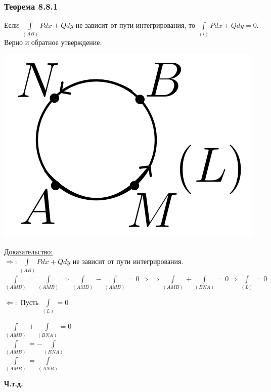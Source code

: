 \documentclass[12pt]{article}
\let\ORIincludegraphics\includegraphics
\renewcommand{\includegraphics}[2][]{\ORIincludegraphics[scale=0.65,#1]{#2}}
\let\oldint\int
\renewcommand{\int}{\oldint\limits}
\begin{document}
  \subsubsection*{Теорема 8.8.1}\label{th:8.8.1}
  \par\noindent
  Если $\int_{(AB)}Pdx+Qdy$ не зависит от пути интегрирования, то $\int_{(l)}Pdx+Qdy=0.$Верно и обратное утверждение.\\
  \begin{minipage}{0.25\textwidth}
    \includegraphics[scale=0.5]{8.8.1.png}
  \end{minipage}
  \hspace{1em}
  \begin{minipage}{0.75\textwidth}
    \underline{Доказательство:}\\
      $\Rightarrow : \int_{(AB)}Pdx+Qdy$ не зависит от пути интегрирования.\\
      $\int_{(AMB)}=\int_{(AMB)} \Rightarrow \int_{(AMB)}-\int_{(AMB)}=0 \Rightarrow
      \Rightarrow \int_{(AMB)}+\int_{(BNA)}=0 \Rightarrow \int_{(L)}=0$
  \end{minipage}
  \vspace{1em}
  \par
  $\Leftarrow:$ Пусть $\int_{(L)}=0$
  \begin{center}
    $\int_{(AMB)}+\int_{(BNA)}=0$\\
    $\int_{(AMB)}=-\int_{(BNA)}$\\
    $\int_{(AMB)}=\int_{(ANB)}$\\
  \end{center}
  \begin{center}
    \textbf{Ч.т.д.}
  \end{center}
\end{document}
